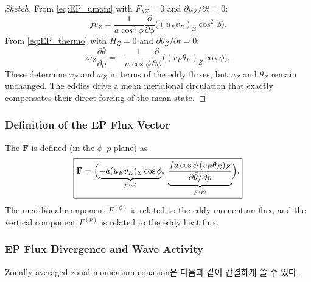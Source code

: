 \begin{proof}[Sketch]
From \eqref{eq:EP_umom} with $F_{\lambda Z} = 0$ and
$\partial u_Z/\partial t = 0$:
\[
  fv_Z = \frac{1}{a\cos^2\phi}\frac{\partial}{\partial\phi}
    \bigl((u_E v_E)_Z\cos^2\phi\bigr).
\]
From \eqref{eq:EP_thermo} with $H_Z = 0$ and
$\partial\theta_Z/\partial t = 0$:
\[
  \omega_Z\frac{\partial\bar{\theta}}{\partial p}
  = -\frac{1}{a\cos\phi}\frac{\partial}{\partial\phi}
    \bigl((v_E\theta_E)_Z\cos\phi\bigr).
\]
These determine $v_Z$ and $\omega_Z$ in terms of the eddy fluxes, but
$u_Z$ and $\theta_Z$ remain unchanged.  The eddies drive a mean
meridional circulation that exactly compensates their direct forcing
of the mean state.
\end{proof}

\subsubsection{Definition of the EP Flux Vector}

\begin{definition}
The  $\mathbf{F}$ is defined (in the
$\phi$--$p$ plane) as
\begin{equation}\label{eq:EP_flux}
  \boxed{
  \mathbf{F} = \Bigl(\underbrace{-a(u_E v_E)_Z\cos\phi}_{F^{(\phi)}},\;
  \underbrace{\frac{fa\cos\phi\,(v_E\theta_E)_Z}
    {\partial\bar{\theta}/\partial p}}_{F^{(p)}}\Bigr).
  }
\end{equation}
The meridional component $F^{(\phi)}$ is related to the eddy momentum
flux, and the vertical component $F^{(p)}$ is related to the eddy
heat flux.
\end{definition}


\subsubsection{EP Flux Divergence and Wave Activity}

Zonally averaged zonal momentum equation은 다음과 같이 간결하게 쓸 수 있다.

